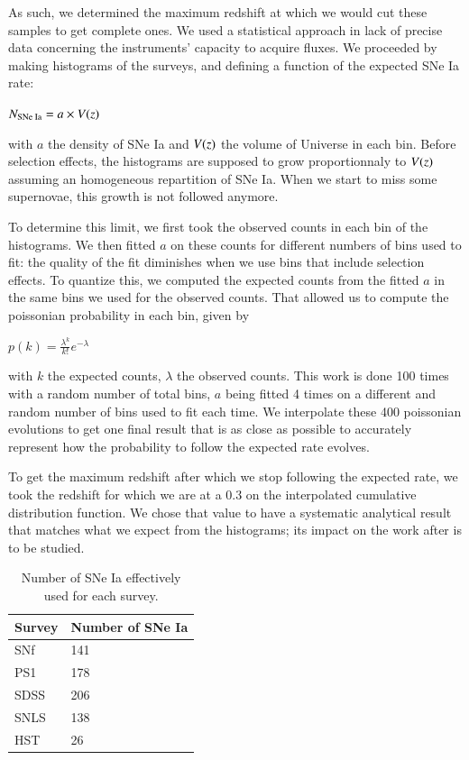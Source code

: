 \documentclass{aa}
\begin{document}
As such, we determined the maximum redshift at which we would cut these samples
to get complete ones. We used a statistical approach in lack of precise data
concerning the instruments' capacity to acquire fluxes. We proceeded by making
histograms of the surveys, and defining a function of the expected SNe Ia rate:
\begin{center}
    $ \displaystyle N_{\text{SNe Ia}} = a \times V(z)$
\end{center}
with $a$ the density of SNe Ia and $V(z)$ the volume of Universe in each bin.
Before selection effects, the histograms are supposed to grow proportionnaly to
$V(z)$ assuming an homogeneous repartition of SNe Ia. When we start to miss some
supernovae, this growth is not followed anymore.

To determine this limit, we first took the observed counts in each bin of the
histograms. We then fitted $a$ on these counts for different numbers of bins
used to fit: the quality of the fit diminishes when we use bins that include
selection effects. To quantize this, we computed the expected counts from the
fitted $a$ in the same bins we used for the observed counts. That allowed us to
compute the poissonian probability in each bin, given by
\begin{center}
    $ \displaystyle p(k) = \frac{\lambda^k}{k!}e^{-\lambda}$
\end{center}
with $k$ the expected counts, $\lambda$ the observed counts. This work is done 100
times with a random number of total bins, $a$ being fitted 4 times on a
different and random number of bins used to fit each time. We interpolate these
400 poissonian evolutions to get one final result that is as close as possible
to accurately represent how the probability to follow the expected rate evolves.

To get the maximum redshift after which we stop following the expected rate, we
took the redshift for which we are at a 0.3 on the interpolated cumulative
distribution function. We chose that value to have a systematic analytical
result that matches what we expect from the histograms; its impact on the work
after is to be studied.

\begin{table}[htbp!]
    \centering
    \caption{Number of SNe Ia effectively used for each survey.}
    \label{tab:sample}
    \begin{tabularx}{\linewidth}{|Y*{1}{|Y}|}\hline
         Survey & Number of SNe Ia \\\hline\hline
        SNf & 141 \\\hline
        PS1 & 178 \\\hline
        SDSS & 206 \\\hline
        SNLS & 138 \\\hline
        HST & 26 \\\hline
    \end{tabularx}
\end{table}
\end{document}
